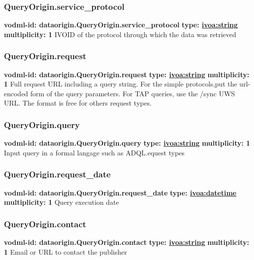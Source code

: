     \subsubsection{QueryOrigin.service\_protocol}
    \textbf{vodml-id: dataorigin.QueryOrigin.service\_protocol} \newline
    \textbf{type: \hyperref[sect:ivoa]{ivoa:string}} \newline
    \textbf{multiplicity: 1} \newline
    IVOID \citep{2007ivoa.spec.0314P} of the protocol through which the data was retrieved

    \subsubsection{QueryOrigin.request}
    \textbf{vodml-id: dataorigin.QueryOrigin.request} \newline
    \textbf{type: \hyperref[sect:ivoa]{ivoa:string}} \newline
    \textbf{multiplicity: 1} \newline
    Full request URL including a query string. For the simple protocols,put the url-encoded form of the query parameters. For TAP queries, use the /sync UWS \citep{2016ivoa.spec.1024H} URL. The format is free for others request types.

    \subsubsection{QueryOrigin.query}
    \textbf{vodml-id: dataorigin.QueryOrigin.query} \newline
    \textbf{type: \hyperref[sect:ivoa]{ivoa:string}} \newline
    \textbf{multiplicity: 1} \newline
    Input query in a formal langage such as ADQL.equest types \citep{2023ivoa.spec.1215M}

    \subsubsection{QueryOrigin.request\_date}
    \textbf{vodml-id: dataorigin.QueryOrigin.request\_date} \newline
    \textbf{type: \hyperref[sect:ivoa]{ivoa:datetime}} \newline
    \textbf{multiplicity: 1} \newline
    Query execution date

    \subsubsection{QueryOrigin.contact}
    \textbf{vodml-id: dataorigin.QueryOrigin.contact} \newline
    \textbf{type: \hyperref[sect:ivoa]{ivoa:string}} \newline
    \textbf{multiplicity: 1} \newline
    Email or URL to contact the publisher

